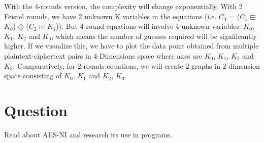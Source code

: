 \documentclass{article}
\begin{document}
\begin{enumerate}[label=\alph*]
With the 4-rounds version, the complexity will change exponentially. With 2 Feistel rounds, we have 2 unknown K variables in the equations (i.e. $C_4$ = ($C_1$ $\boxplus$ $K_0$) $\oplus$ ($C_2$ $\boxplus$ $K_1$)). But 4-round equations will involve 4 unknown variables: $K_0$, $K_1$, $K_2$ and $K_3$, which means the number of guesses required will be significantly higher. If we visualize this, we have to plot the data point obtained from multiple plaintext-ciphertext pairs in 4-Dimensions space where axes are $K_0$, $K_1$, $K_2$ and $K_3$. Comparatively, for 2-rounds equations, we will create 2 graphs in 2-dimension space consisting of $K_0$, $K_1$ and $K_2$, $K_3$.

\end{enumerate}

\section{Question}
Read about AES-NI and research its use in programs.
\end{document}
